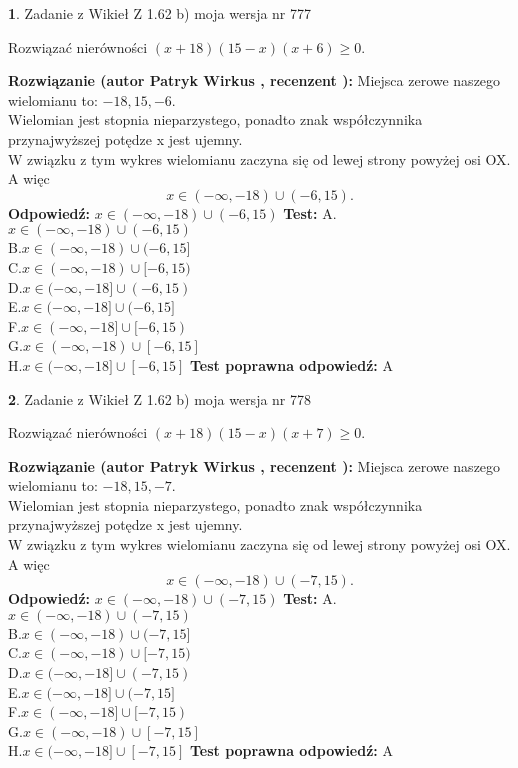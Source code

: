 \documentclass[12pt, a4paper]{article}
\theoremstyle{definition} %
\newtheorem{zad}{}
\newcommand{\zadStart}[1]{\begin{zad}#1\newline}
\newcommand{\zadStop}{\end{zad}}
\newcommand{\rozwStart}[2]{\noindent \textbf{Rozwiązanie (autor #1 , recenzent #2): }\newline}
\newcommand{\rozwStop}{\newline}
\newcommand{\odpStart}{\noindent \textbf{Odpowiedź:}\newline}
\newcommand{\odpStop}{\newline}
\newcommand{\testStart}{\noindent \textbf{Test:}\newline}
\newcommand{\testStop}{\newline}
\newcommand{\kluczStart}{\noindent \textbf{Test poprawna odpowiedź:}\newline}
\newcommand{\kluczStop}{\newline}
\begin{document}
\zadStart{Zadanie z Wikieł Z 1.62 b) moja wersja nr 777}

Rozwiązać nierówności $(x+18)(15-x)(x+6)\ge0$.
\zadStop
\rozwStart{Patryk Wirkus}{}
Miejsca zerowe naszego wielomianu to: $-18, 15, -6$.\\
Wielomian jest stopnia nieparzystego, ponadto znak współczynnika przy\linebreak najwyższej potędze x jest ujemny.\\ W związku z tym wykres wielomianu zaczyna się od lewej strony powyżej osi OX. A więc $$x \in (-\infty,-18) \cup (-6,15).$$
\rozwStop
\odpStart
$x \in (-\infty,-18) \cup (-6,15)$
\odpStop
\testStart
A.$x \in (-\infty,-18) \cup (-6,15)$\\
B.$x \in (-\infty,-18) \cup (-6,15]$\\
C.$x \in (-\infty,-18) \cup [-6,15)$\\
D.$x \in (-\infty,-18] \cup (-6,15)$\\
E.$x \in (-\infty,-18] \cup (-6,15]$\\
F.$x \in (-\infty,-18] \cup [-6,15)$\\
G.$x \in (-\infty,-18) \cup [-6,15]$\\
H.$x \in (-\infty,-18] \cup [-6,15]$
\testStop
\kluczStart
A
\kluczStop



\zadStart{Zadanie z Wikieł Z 1.62 b) moja wersja nr 778}

Rozwiązać nierówności $(x+18)(15-x)(x+7)\ge0$.
\zadStop
\rozwStart{Patryk Wirkus}{}
Miejsca zerowe naszego wielomianu to: $-18, 15, -7$.\\
Wielomian jest stopnia nieparzystego, ponadto znak współczynnika przy\linebreak najwyższej potędze x jest ujemny.\\ W związku z tym wykres wielomianu zaczyna się od lewej strony powyżej osi OX. A więc $$x \in (-\infty,-18) \cup (-7,15).$$
\rozwStop
\odpStart
$x \in (-\infty,-18) \cup (-7,15)$
\odpStop
\testStart
A.$x \in (-\infty,-18) \cup (-7,15)$\\
B.$x \in (-\infty,-18) \cup (-7,15]$\\
C.$x \in (-\infty,-18) \cup [-7,15)$\\
D.$x \in (-\infty,-18] \cup (-7,15)$\\
E.$x \in (-\infty,-18] \cup (-7,15]$\\
F.$x \in (-\infty,-18] \cup [-7,15)$\\
G.$x \in (-\infty,-18) \cup [-7,15]$\\
H.$x \in (-\infty,-18] \cup [-7,15]$
\testStop
\kluczStart
A
\kluczStop
\end{document}
